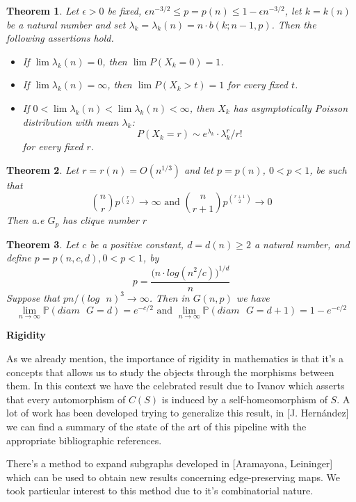 \documentclass[a4paper]{tufte-handout}
\renewcommand{\P}{\mathbb{P}}
\newtheorem{theorem}{Theorem}[section]
\begin{document}
\begin{theorem}
Let $\epsilon>0$ be fixed, $\epsilon n^{-3/2} \leq p = p(n) \leq 1 - \epsilon n^{-3/2}$, let $k = k(n)$ be a natural number and set $\lambda_{k} = \lambda_{k}(n) = n\cdot b(k;n - 1,p)$. Then the following assertions hold.

\begin{itemize}
\item If $\lim \lambda_{k}(n) = 0$, then $\lim P(X_{k} = 0) = 1$. 
\item If $\lim \lambda_{k}(n) = \infty$, then $\lim P(X_{k} > t) = 1$
for every fixed $t$.
\item If $0 < \lim\lambda_{k}(n) < \lim \lambda_{k}(n) < \infty$,
then $X_{k}$ has asymptotically Poisson distribution with mean $\lambda_{k}$: 
$$P(X_{k} = r) \sim e^{\lambda_{k}}\cdot \lambda_{k}^{r}/ r!$$
for every fixed $r$.
\end{itemize}
\end{theorem}
\begin{theorem}
Let $r = r(n) = O(n^{1/3})$ and let $p=p(n)$, $0<p<1$, be such that
$$\binom{n}{r} p^{\binom{r}{2}} \to \infty \text{ and } \binom{n}{r+1} p^{\binom{r+1}{2}} \to 0 $$
Then a.e $G_{p}$ has clique number $r$
\end{theorem}
\begin{theorem}
Let $c$ be a positive constant, $d=d(n)\geq 2$ a natural number, and define $p=p(n,c,d), 0<p<1$, by
$$p = \frac{\big( n\cdot log(n^2/c)\big) ^{1/d}}{n}$$
Suppose that $pn/(log\text{ }n)^{3} \to \infty$. Then in $G(n,p)$ we have
$$\lim_{n\to \infty} \P (diam\text{ }G = d) = e^{-c/2} \text{ and }  \lim_{n\to \infty} \P (diam\text{ }G = d+1) = 1 - e^{-c/2}$$
\end{theorem}

\noindent\hrulefill

{\Large \noindent \textbf{Rigidity}}

As we already mention, the importance of rigidity in mathematics is that it's a concepts that allows us to study the objects through the morphisms between them. In this context we have the celebrated result due to Ivanov which asserts that every automorphism of $C(S)$ is induced by a self-homeomorphism of $S$. A lot of work has been developed trying to generalize this result, in [J. Hernández]\cite{rigidExpJH} we can find a summary of the state of the art of this pipeline with the appropriate bibliographic references. 

There's a method to expand subgraphs developed in [Aramayona, Leininger]\cite{rigidExpJH} which can be used to obtain new results concerning edge-preserving maps. We took particular interest to this method due to it's combinatorial nature.
\end{document}
